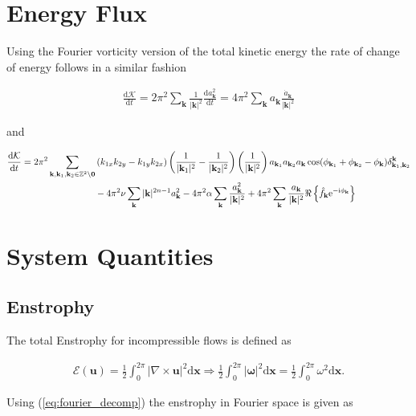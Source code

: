\documentclass[9pt]{article}
\newcommand{\der}[2]{\frac{\mathrm{d}#1}{\mathrm{d}#2}}          	 %
\newcommand{\ii}{\mathrm{i}}      								  %
\newcommand{\e}{\mathrm{e}}      								  %
\newcommand{\curl}[1]{\nabla \times {#1}}								%
\newcommand{\bfu}{\mathbf{u}}											%
\newcommand{\bfx}{\mathbf{x}}								%
\newcommand{\bfk}{\mathbf{k}}								%
\newcommand{\bfkn}[1]{\mathbf{k}_{#1}}								%
\begin{document}
\section{Energy Flux}

Using the Fourier vorticity version of the total kinetic energy the rate of change of energy follows in a similar fashion

\begin{align}
	\der{\mathcal{K}}{t} = 2\pi^2\sum_{\bfk}  \frac{1}{|\bfk|^2}\der{a_\bfk^2}{t} =4\pi^2\sum_{\bfk} a_\bfk \frac{\dot{a}_\bfk}{|\bfk|^2}
\end{align}

and 

\begin{align}
	\der{\mathcal{K}}{t} &= 2\pi^2	\sum_{\bfk, \mathbf{k}_1, \mathbf{k}_2\in \mathbb{Z}^2\setminus \mathbf{0}}\left(k_{1x}k_{2y} - k_{1y}k_{2x}\right) \left(\frac{1}{|\bfkn{1}|^2} - \frac{1}{|\bfkn{2}|^2}\right) \left( \frac{1}{|\bfk|^2}\right)a_{\bfkn{1}} a_{\bfkn{2}} a_{\bfk} \cos(\phi_{\bfkn{1}} + \phi_{\bfkn{2}} - \phi_{\bfk})\delta_{\bfkn{1}, \bfkn{2}}^{\bfk} \notag \\ & \qquad \qquad \qquad \qquad- 4\pi^2\nu \sum_{\bfk}|\bfk|^{2n - 1} a_{\bfk}^2 - 4\pi^2\alpha\sum_{\bfk} \frac{a_\bfk^2}{|\bfk|^2} + 4\pi^2\sum_{\bfk}\frac{a_\bfk}{|\bfk|^2}\Re\left\{\hat{f}_{\bfk} \e^{-\ii\phi_\bfk}\right\}
\end{align}

\section{System Quantities}

\subsection{Enstrophy}

The total Enstrophy for incompressible flows is defined as 

\begin{align}
	\mathcal{E}(\bfu) = \frac{1}{2}\int_{0}^{2\pi} |\curl{\bfu}|^2 \mathrm{d}\bfx \Rightarrow \frac{1}{2}\int_{0}^{2\pi} |\bm{\omega}|^2 \mathrm{d}\bfx = \frac{1}{2}\int_{0}^{2\pi} \omega^2 \mathrm{d}\bfx .
	\label{eq:enstrophy_def}
\end{align}

Using (\ref{eq:fourier_decomp}) the enstrophy in Fourier space is given as 
\end{document}
